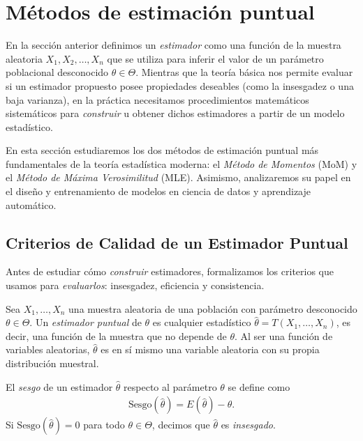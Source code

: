 \section{Métodos de estimación puntual}

En la sección anterior definimos un \emph{estimador} como una función de la muestra aleatoria $X_1, X_2, \ldots, X_n$ que se utiliza para inferir el valor de un parámetro poblacional desconocido $\theta \in \Theta$. Mientras que la teoría básica nos permite evaluar si un estimador propuesto posee propiedades deseables (como la insesgadez o una baja varianza), en la práctica necesitamos procedimientos matemáticos sistemáticos para \emph{construir} u obtener dichos estimadores a partir de un modelo estadístico.

En esta sección estudiaremos los dos métodos de estimación puntual más fundamentales de la teoría estadística moderna: el \emph{Método de Momentos} (MoM) y el \emph{Método de Máxima Verosimilitud} (MLE). Asimismo, analizaremos su papel en el diseño y entrenamiento de modelos en ciencia de datos y aprendizaje automático.

\subsection{Criterios de Calidad de un Estimador Puntual}

Antes de estudiar cómo \emph{construir} estimadores, formalizamos los criterios que usamos para \emph{evaluarlos}: insesgadez, eficiencia y consistencia.

\begin{definicion}
Sea $X_1, \ldots, X_n$ una muestra aleatoria de una población con parámetro desconocido $\theta \in \Theta$. Un \emph{estimador puntual} de $\theta$ es cualquier estadístico $\hat{\theta} = T(X_1, \ldots, X_n)$, es decir, una función de la muestra que no depende de $\theta$. Al ser una función de variables aleatorias, $\hat{\theta}$ es en sí mismo una variable aleatoria con su propia distribución muestral.
\end{definicion}

\begin{definicion}[Sesgo]
 \label{eq:6.1.1}
El \emph{sesgo} de un estimador $\hat{\theta}$ respecto al parámetro $\theta$ se define como
\begin{align}
 \text{Sesgo}(\hat{\theta}) = E(\hat{\theta}) - \theta.
\end{align}
Si $\text{Sesgo}(\hat{\theta}) = 0$ para todo $\theta \in \Theta$, decimos que $\hat{\theta}$ es \emph{insesgado}.
\end{definicion}

